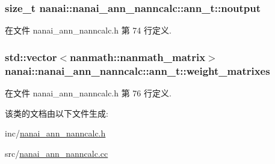 \subsubsection[{noutput}]{\setlength{\rightskip}{0pt plus 5cm}size\+\_\+t nanai\+::nanai\+\_\+ann\+\_\+nanncalc\+::ann\+\_\+t\+::noutput}\label{classnanai_1_1nanai__ann__nanncalc_1_1ann__t_aaae404e72445cd09ff003c74c41e9954}


在文件 nanai\+\_\+ann\+\_\+nanncalc.\+h 第 74 行定义.

\hypertarget{classnanai_1_1nanai__ann__nanncalc_1_1ann__t_ab97f18840eabc4def4fc3c66837d0960}{}
\subsubsection[{weight\+\_\+matrixes}]{\setlength{\rightskip}{0pt plus 5cm}std\+::vector$<${\bf nanmath\+::nanmath\+\_\+matrix}$>$ nanai\+::nanai\+\_\+ann\+\_\+nanncalc\+::ann\+\_\+t\+::weight\+\_\+matrixes}\label{classnanai_1_1nanai__ann__nanncalc_1_1ann__t_ab97f18840eabc4def4fc3c66837d0960}


在文件 nanai\+\_\+ann\+\_\+nanncalc.\+h 第 76 行定义.



该类的文档由以下文件生成\+:\begin{DoxyCompactItemize}
\item 
inc/\hyperlink{nanai__ann__nanncalc_8h}{nanai\+\_\+ann\+\_\+nanncalc.\+h}\item 
src/\hyperlink{nanai__ann__nanncalc_8cc}{nanai\+\_\+ann\+\_\+nanncalc.\+cc}\end{DoxyCompactItemize}
